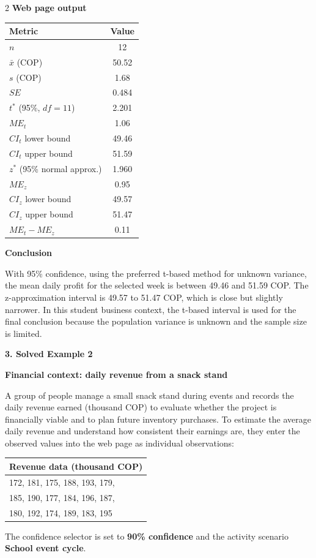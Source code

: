 \documentclass[12pt]{article}
\newcommand{\SubsectionBox}[1]{%
	\noindent\colorbox{gray!30}{%
		\parbox{\linewidth}{\textbf{#1}}%
	}\par\vspace{0.35cm}%
}
\begin{document}
\begin{multicols}{2}
		\textbf{Web page output}\par
		\begin{center}
			\begin{tabular}{l c}
				\hline
				Metric & Value \\
				\hline
				$n$ & 12 \\
				$\bar{x}$ (COP) & 50.52 \\
				$s$ (COP) & 1.68 \\
				$SE$ & 0.484 \\
				$t^*$ (95\%, $df=11$) & 2.201 \\
				$ME_t$ & 1.06 \\
				$CI_t$ lower bound & 49.46 \\
				$CI_t$ upper bound & 51.59 \\
				$z^*$ (95\% normal approx.) & 1.960 \\
				$ME_z$ & 0.95 \\
				$CI_z$ lower bound & 49.57 \\
				$CI_z$ upper bound & 51.47 \\
				$ME_t-ME_z$ & 0.11 \\
				\hline
			\end{tabular}
		\end{center}
		
		\textbf{Conclusion}\par
		With 95\% confidence, using the preferred t-based method for unknown variance, the mean daily profit for the selected week is between 49.46 and 51.59 COP. The z-approximation interval is 49.57 to 51.47 COP, which is close but slightly narrower. In this student business context, the t-based interval is used for the final conclusion because the population variance is unknown and the sample size is limited.
		
		
		
		\vspace{2cm}
		\SubsectionBox{3. Solved Example 2}
		
		\textbf{Financial context: daily revenue from a snack stand}\par
		A group of people manage a small snack stand during events and records the daily revenue earned (thousand COP) to evaluate whether the project is financially viable and to plan future inventory purchases. To estimate the average daily revenue and understand how consistent their earnings are, they enter the observed values into the web page as individual observations:
		
		\begin{center}
			\begin{tabular}{l}
				\hline
				Revenue data (thousand COP) \\
				\hline
				172, 181, 175, 188, 193, 179,\\
				185, 190, 177, 184, 196, 187,\\
				180, 192, 174, 189, 183, 195 \\
				\hline
			\end{tabular}
		\end{center}
		The confidence selector is set to \textbf{90\% confidence} and the activity scenario \textbf{School event cycle}.
		

\end{multicols}
\end{document}
